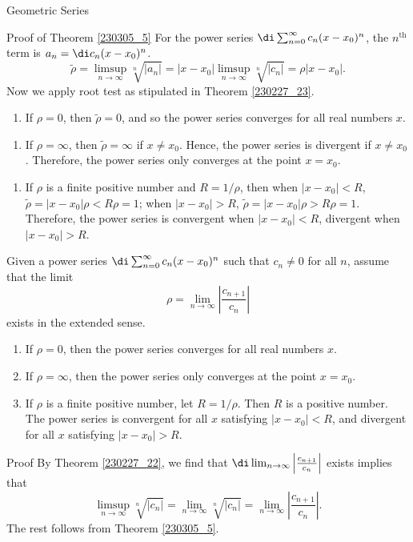 \begin{example}[label=230305_16]{Geometric Series}
\begin{example}[label=230304_9]{}
\begin{myproof}{\linkt Proof of Theorem \ref{230305_5}}
For the power series $\di\sum_{n=0}^{\infty}c_n(x-x_0)^n$, the $n^{\text{th}}$ term is
 $a_n=\di c_n(x-x_0)^n$. 
 \[\widetilde{\rho}=\limsup_{n\to\infty}\sqrt[n]{|a_n|}=|x-x_0|\limsup_{n\to\infty}\sqrt[n]{|c_n|}=\rho|x-x_0|.\]
Now we apply root test as stipulated in Theorem \ref{230227_23}.
\begin{enumerate}[1.]
\item If $\rho=0$, then $\widetilde{\rho}=0$, and so the power series converges  for all real numbers $x$.\end{enumerate}\begin{enumerate}[2.]
\item If $\rho=\infty$, then $\widetilde{\rho}=\infty$ if $x\neq x_0$. Hence, the power series is divergent if $x\neq x_0$. Therefore, the power series only converges at the point $x=x_0$.\end{enumerate} \begin{enumerate}[3.]
\item If $\rho$ is a finite positive number and $R=1/\rho$,  then when $|x-x_0|<R$, $\widetilde{\rho}=|x-x_0|\rho<R\rho=1$; when $|x-x_0|>R$, $\widetilde{\rho}=|x-x_0|\rho>R\rho=1$. Therefore, the power series is convergent when $|x-x_0|<R$, divergent when $|x-x_0|>R$.
\end{enumerate}
\end{myproof}


\begin{corollary}{}
Given a power series $\di\sum_{n=0}^{\infty}c_n(x-x_0)^n$ such that $c_n\neq 0$ for all $n$, assume that the limit
\[\rho=\lim_{n\to\infty}\left|\frac{c_{n+1}}{c_n}\right|\]exists in the extended sense.
\begin{enumerate}[1.]
\item If $\rho=0$, then the power series converges  for all real numbers $x$.
\item If $\rho=\infty$, then the power series only converges at the point $x=x_0$.
\item If $\rho$ is a finite positive number, let $R=1/\rho$. Then $R$ is a positive number. The power series is convergent for all $x$ satisfying $|x-x_0|<R$, and divergent for all $x$ satisfying $|x-x_0|>R$. 

\end{enumerate}
\end{corollary}
\begin{myproof}{Proof}
By Theorem \ref{230227_22}, we find that  $\di\lim_{n\to\infty}\left|\frac{c_{n+1}}{c_n}\right|$ exists implies that
\[\limsup_{n\to\infty}\sqrt[n]{|c_n|}=\lim_{n\to\infty}\sqrt[n]{|c_n|}=\lim_{n\to\infty}\left|\frac{c_{n+1}}{c_n}\right|.\] The rest follows from Theorem \ref{230305_5}.
\end{myproof}


\end{example}
\end{example}
